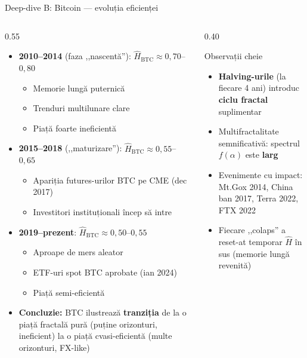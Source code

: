 \documentclass[9pt, aspectratio=169, t]{beamer}
\theoremstyle{definition}
\newenvironment{cminipage}[1]{%
    \par\noindent\hfill\begin{minipage}{#1}\ignorespaces
}{%
    \end{minipage}\hfill\null\par
}
\begin{document}
\begin{frame}[shrink=15]{Deep-dive B: Bitcoin --- evoluția eficienței}
\begin{cminipage}{0.95\textwidth}
\begin{columns}[T]
\begin{column}{0.55\textwidth}
\begin{itemize}\setlength{\itemsep}{0pt}
    \item \textbf{2010--2014} (faza ,,nascentă''): $\hat{H}_{\text{BTC}} \approx 0{,}70$--$0{,}80$
    \begin{itemize}\setlength{\itemsep}{0pt}
        \item Memorie lungă puternică
        \item Trenduri multilunare clare
        \item Piață foarte ineficientă
    \end{itemize}
    \item \textbf{2015--2018} (,,maturizare''): $\hat{H}_{\text{BTC}} \approx 0{,}55$--$0{,}65$
    \begin{itemize}\setlength{\itemsep}{0pt}
        \item Apariția futures-urilor BTC pe CME (dec 2017)
        \item Investitori instituționali încep să intre
    \end{itemize}
    \item \textbf{2019--prezent}: $\hat{H}_{\text{BTC}} \approx 0{,}50$--$0{,}55$
    \begin{itemize}\setlength{\itemsep}{0pt}
        \item Aproape de mers aleator
        \item ETF-uri spot BTC aprobate (ian 2024)
        \item Piață semi-eficientă
    \end{itemize}
    \item \textbf{Concluzie:} BTC ilustrează \textbf{tranziția} de la o piață fractală pură (puține orizonturi, ineficient) la o piață cvasi-eficientă (multe orizonturi, FX-like)
\end{itemize}
\end{column}
\begin{column}{0.40\textwidth}
\begin{alertblock}{Observații cheie}
\begin{itemize}\setlength{\itemsep}{0pt}
    \item \textbf{Halving-urile} (la fiecare 4 ani) introduc \textbf{ciclu fractal} suplimentar
    \item Multifractalitate semnificativă: spectrul $f(\alpha)$ este \textbf{larg}
    \item Evenimente cu impact: Mt.Gox 2014, China ban 2017, Terra 2022, FTX 2022
    \item Fiecare ,,colaps'' a reset-at temporar $\hat{H}$ în sus (memorie lungă revenită)
\end{itemize}
\end{alertblock}


\end{column}
\end{columns}
\end{cminipage}
\end{frame}
\end{document}
